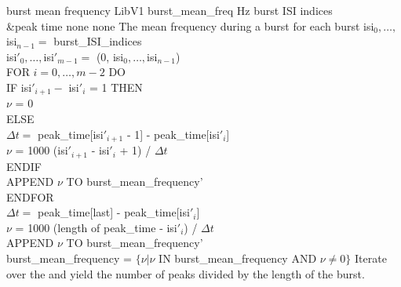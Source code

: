 \begin{efeature}
  {burst mean frequency}
  {LibV1}
  {burst\_mean\_freq}
  {Hz}
  {burst ISI indices\\&peak time}
  {none}
  {none}
  {The mean frequency during a burst for each burst}
  {
  isi$_0, \ldots, $isi$_{n-1} =$ burst\_ISI\_indices \\
  isi$'_0, \ldots, $isi$'_{m-1} =$ (0, isi$_0, \ldots, $isi$_{n-1}$) \\
  FOR $i = 0, \dots, m - 2$ DO \+ \\
    IF isi$'_{i+1} -$ isi$'_{i}$ = 1 THEN \+ \\
      $\nu$ = 0 \- \\
    ELSE \+ \\
      $\Delta t =$ peak\_time[isi$'_{i+1}$ - 1] - peak\_time[isi$'_i$] \\
      $\nu$ = 1000 (isi$'_{i+1}$ - isi$'_i$ + 1) / $\Delta t$ \- \\
    ENDIF \\
    APPEND $\nu$ TO burst\_mean\_frequency' \- \\
  ENDFOR \\
  $\Delta t =$ peak\_time[last] - peak\_time[isi$'_i$] \\
  $\nu$ = 1000 (length of peak\_time - isi$'_i$) / $\Delta t$ \\
  APPEND $\nu$ TO burst\_mean\_frequency' \\
  burst\_mean\_frequency = $\{\nu|\nu$ IN burst\_mean\_frequency AND $\nu \neq 0\}$
  }
  Iterate over the  and yield the number of peaks divided by the length of the burst.
  
\end{efeature}

